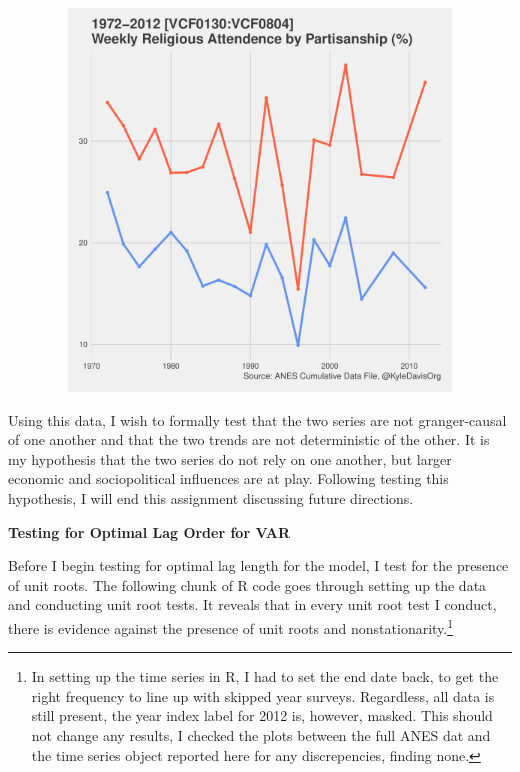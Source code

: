 \documentclass[12pt]{article}\usepackage[]{graphicx}\usepackage[]{color}
\newenvironment{knitrout}{}{} %
\begin{document}
\begin{flushleft}
\begin{center}
\begin{knitrout}
\color{fgcolor}
\includegraphics[width=6in,height=4in]{figure/descriptiveplot-1} 

\end{knitrout}
\end{center}

Using this data, I wish to formally test that the two series are not granger-causal of one another and that the two trends are not deterministic of the other. It is my hypothesis that the two series do not rely on one another, but larger economic and sociopolitical influences are at play. Following testing this hypothesis, I will end this assignment discussing future directions.

\textbf{Testing for Optimal Lag Order for VAR}

Before I begin testing for optimal lag length for the model, I test for the presence of unit roots. The following chunk of R code goes through setting up the data and conducting unit root tests. It reveals that in every unit root test I conduct, there is evidence against the presence of unit roots and nonstationarity.\footnote{In setting up the time series in R, I had to set the end date back, to get the right frequency to line up with skipped year surveys. Regardless, all data is still present, the year index label for 2012 is, however, masked. This should not change any results, I checked the plots between the full ANES dat and the time series object reported here for any discrepencies, finding none.}


\end{flushleft}
\end{document}
